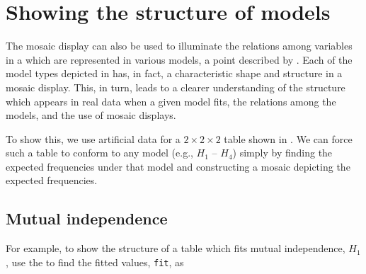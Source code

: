 \section{Showing the structure of \loglin{} models}\label{sec:mosaic-struc}
The mosaic display can also be used to illuminate the relations among
variables in a \ctab{} which are represented in various \loglin{} models,
a point described by \citet{TheusLauer:99}.
Each of the model types depicted in  has, in fact,
a characteristic shape and structure in a mosaic display. This,
in turn, leads to a clearer understanding of the structure which appears
in real data when a given model fits, the relations among the models,
and the use of mosaic displays.


To show this, we use artificial data for a $2 \times 2 \times 2$ table
shown in .
We can force such a table to conform to any \loglin{} model
(e.g., $H_1$ -- $H_4$)
simply by finding the expected frequencies under that model
and constructing a mosaic depicting the expected frequencies.

\subsection{Mutual independence}
For example, to show the structure of a table which fits
mutual independence, $H_1$, use the  to find the
fitted values, \texttt{fit}, as

